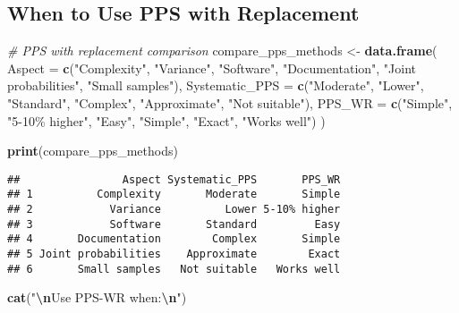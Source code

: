 \documentclass[
]{article}
\newenvironment{Shaded}{\begin{snugshade}}{\end{snugshade}}
\newcommand{\AttributeTok}[1]{\textcolor[rgb]{0.13,0.29,0.53}{#1}}
\newcommand{\CommentTok}[1]{\textcolor[rgb]{0.56,0.35,0.01}{\textit{#1}}}
\newcommand{\FunctionTok}[1]{\textcolor[rgb]{0.13,0.29,0.53}{\textbf{#1}}}
\newcommand{\NormalTok}[1]{#1}
\newcommand{\OtherTok}[1]{\textcolor[rgb]{0.56,0.35,0.01}{#1}}
\newcommand{\SpecialCharTok}[1]{\textcolor[rgb]{0.81,0.36,0.00}{\textbf{#1}}}
\newcommand{\StringTok}[1]{\textcolor[rgb]{0.31,0.60,0.02}{#1}}
\begin{document}
\subsection{When to Use PPS with
Replacement}\label{when-to-use-pps-with-replacement}

\begin{Shaded}
\begin{Highlighting}[]
\CommentTok{\# PPS with replacement comparison}
\NormalTok{compare\_pps\_methods }\OtherTok{\textless{}{-}} \FunctionTok{data.frame}\NormalTok{(}
  \AttributeTok{Aspect =} \FunctionTok{c}\NormalTok{(}\StringTok{"Complexity"}\NormalTok{, }\StringTok{"Variance"}\NormalTok{, }\StringTok{"Software"}\NormalTok{, }\StringTok{"Documentation"}\NormalTok{,}
             \StringTok{"Joint probabilities"}\NormalTok{, }\StringTok{"Small samples"}\NormalTok{),}
  \AttributeTok{Systematic\_PPS =} \FunctionTok{c}\NormalTok{(}\StringTok{"Moderate"}\NormalTok{, }\StringTok{"Lower"}\NormalTok{, }\StringTok{"Standard"}\NormalTok{, }\StringTok{"Complex"}\NormalTok{,}
                     \StringTok{"Approximate"}\NormalTok{, }\StringTok{"Not suitable"}\NormalTok{),}
  \AttributeTok{PPS\_WR =} \FunctionTok{c}\NormalTok{(}\StringTok{"Simple"}\NormalTok{, }\StringTok{"5{-}10\% higher"}\NormalTok{, }\StringTok{"Easy"}\NormalTok{, }\StringTok{"Simple"}\NormalTok{,}
            \StringTok{"Exact"}\NormalTok{, }\StringTok{"Works well"}\NormalTok{)}
\NormalTok{)}

\FunctionTok{print}\NormalTok{(compare\_pps\_methods)}
\end{Highlighting}
\end{Shaded}

\begin{verbatim}
##                Aspect Systematic_PPS       PPS_WR
## 1          Complexity       Moderate       Simple
## 2            Variance          Lower 5-10% higher
## 3            Software       Standard         Easy
## 4       Documentation        Complex       Simple
## 5 Joint probabilities    Approximate        Exact
## 6       Small samples   Not suitable   Works well
\end{verbatim}

\begin{Shaded}
\begin{Highlighting}[]
\FunctionTok{cat}\NormalTok{(}\StringTok{"}\SpecialCharTok{\textbackslash{}n}\StringTok{Use PPS{-}WR when:}\SpecialCharTok{\textbackslash{}n}\StringTok{"}\NormalTok{)}
\end{Highlighting}
\end{Shaded}
\end{document}
